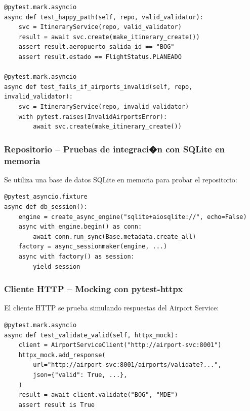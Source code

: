 \documentclass[12pt,a4paper]{article}
\begin{document}
\vspace{0.3cm}
\begin{lstlisting}[style=pythonstyle]
@pytest.mark.asyncio
async def test_happy_path(self, repo, valid_validator):
    svc = ItineraryService(repo, valid_validator)
    result = await svc.create(make_itinerary_create())
    assert result.aeropuerto_salida_id == "BOG"
    assert result.estado == FlightStatus.PLANEADO

@pytest.mark.asyncio
async def test_fails_if_airports_invalid(self, repo, invalid_validator):
    svc = ItineraryService(repo, invalid_validator)
    with pytest.raises(InvalidAirportsError):
        await svc.create(make_itinerary_create())
\end{lstlisting}

\subsubsection{Repositorio -- Pruebas de integraci�n con SQLite en memoria}
Se utiliza una base de datos SQLite en memoria para probar el repositorio:

\vspace{0.3cm}
\begin{lstlisting}[style=pythonstyle]
@pytest_asyncio.fixture
async def db_session():
    engine = create_async_engine("sqlite+aiosqlite://", echo=False)
    async with engine.begin() as conn:
        await conn.run_sync(Base.metadata.create_all)
    factory = async_sessionmaker(engine, ...)
    async with factory() as session:
        yield session
\end{lstlisting}

\subsubsection{Cliente HTTP -- Mocking con pytest-httpx}
El cliente HTTP se prueba simulando respuestas del Airport Service:

\vspace{0.3cm}
\begin{lstlisting}[style=pythonstyle]
@pytest.mark.asyncio
async def test_validate_valid(self, httpx_mock):
    client = AirportServiceClient("http://airport-svc:8001")
    httpx_mock.add_response(
        url="http://airport-svc:8001/airports/validate?...",
        json={"valid": True, ...},
    )
    result = await client.validate("BOG", "MDE")
    assert result is True
\end{lstlisting}

\end{document}
